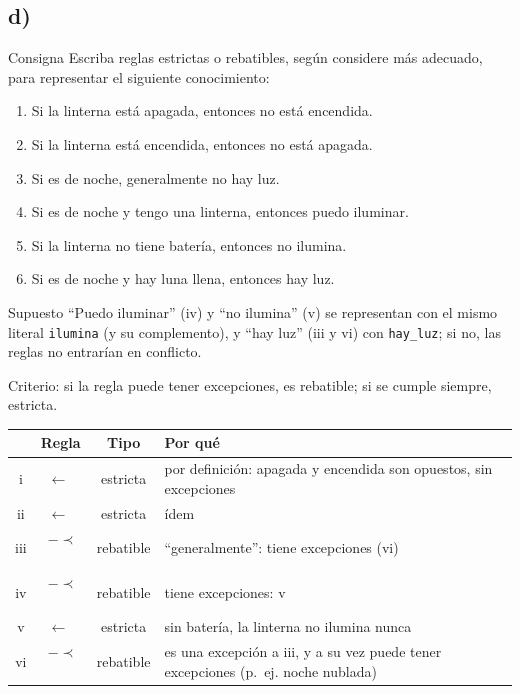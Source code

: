 \documentclass[11pt,a4paper]{article}
\newcommand{\nf}{\textasciitilde}                 %
\newcommand{\reb}{\mathrel{-\!\!\!\prec}}         %
\newcommand{\est}{\leftarrow}                      %
\newcommand{\regla}[3]{\text{\texttt{#1}}~\ensuremath{#2}~\text{\texttt{#3}}}
\begin{document}
\subsection{d)}

\begin{enunciado}{Consigna}
Escriba reglas estrictas o rebatibles, según considere más adecuado, para representar el siguiente conocimiento:
\begin{enumerate}[label=\roman*.]
  \item Si la linterna está apagada, entonces no está encendida.
  \item Si la linterna está encendida, entonces no está apagada.
  \item Si es de noche, generalmente no hay luz.
  \item Si es de noche y tengo una linterna, entonces puedo iluminar.
  \item Si la linterna no tiene batería, entonces no ilumina.
  \item Si es de noche y hay luna llena, entonces hay luz.
\end{enumerate}
\end{enunciado}

\begin{aviso}{Supuesto}
``Puedo iluminar'' (iv) y ``no ilumina'' (v) se representan con el mismo literal \texttt{ilumina} (y su complemento), y ``hay luz'' (iii y vi) con \texttt{hay\_luz}; si no, las reglas no entrarían en conflicto.
\end{aviso}

Criterio: si la regla puede tener excepciones, es rebatible; si se cumple siempre, estricta.

\begin{center}
\small
\begin{tabularx}{\linewidth}{@{}c l c X@{}}
\toprule
 & \textbf{Regla} & \textbf{Tipo} & \textbf{Por qué} \\
\midrule
i & \regla{\nf encendida}{\est}{apagada} & estricta & por definición: apagada y encendida son opuestos, sin excepciones \\
ii & \regla{\nf apagada}{\est}{encendida} & estricta & ídem \\
iii & \regla{\nf hay\_luz}{\reb}{de\_noche} & rebatible & ``generalmente'': tiene excepciones (vi) \\
iv & \regla{ilumina}{\reb}{de\_noche, tengo\_linterna} & rebatible & tiene excepciones: v \\
v & \regla{\nf ilumina}{\est}{\nf tiene\_bateria} & estricta & sin batería, la linterna no ilumina nunca \\
vi & \regla{hay\_luz}{\reb}{de\_noche, luna\_llena} & rebatible & es una excepción a iii, y a su vez puede tener excepciones (p.~ej. noche nublada) \\
\bottomrule
\end{tabularx}
\end{center}
\end{document}
